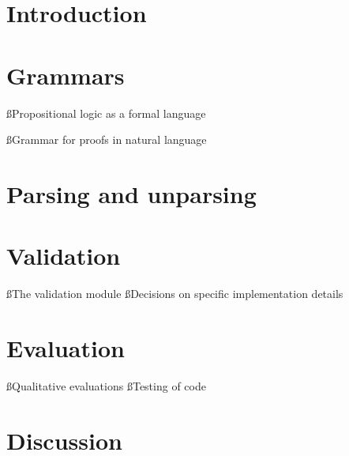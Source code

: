\documentclass[a4paper]{article}
\title{\tit}
\begin{document}
\begin{titlepage}
\maketitle
\thispagestyle{empty}
\end{titlepage}

\fancyfoot[]{}



\pagebreak
\setcounter{tocdepth}{2}
\tableofcontents
\pagebreak
\lstlistoflistings
\pagebreak
\listoffigures
\clearpage
{}

\section{Introduction} %

\clearpage

\section{Grammars}
\ss{Propositional logic as a formal language}


\ss{Grammar for proofs in natural language}\label{nlgram}


\section{Parsing and unparsing}


\section{Validation}
\ss{The validation module}
\ss{Decisions on specific implementation details}

\section{Evaluation}
\ss{Qualitative evaluations}
\ss{Testing of code}

\section{Discussion}
\end{document}
